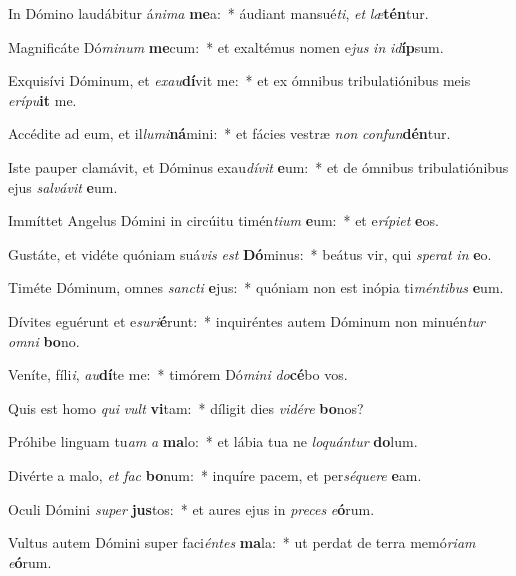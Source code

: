 \item In Dómino laudábitur á\textit{ni}\textit{ma} \textbf{me}a:~* áudiant mansué\textit{ti}, \textit{et} \textit{læ}\textbf{tén}tur.
\item Magnificáte Dó\textit{mi}\textit{num} \textbf{me}cum:~* et exaltémus nomen e\textit{jus} \textit{in} \textit{id}\textbf{íp}sum.
\item Exquisívi Dóminum, et \textit{ex}\textit{au}\textbf{dí}vit me:~* et ex ómnibus tribulatiónibus meis \textit{e}\textit{rí}\textit{pu}\textbf{it} me.
\item Accédite ad eum, et il\textit{lu}\textit{mi}\textbf{ná}mini:~* et fácies vestræ \textit{non} \textit{con}\textit{fun}\textbf{dén}tur.
\item Iste pauper clamávit, et Dóminus exau\textit{dí}\textit{vit} \textbf{e}um:~* et de ómnibus tribulatiónibus ejus \textit{sal}\textit{vá}\textit{vit} \textbf{e}um.
\item Immíttet Angelus Dómini in circúitu timén\textit{ti}\textit{um} \textbf{e}um:~* et e\textit{rí}\textit{pi}\textit{et} \textbf{e}os.
\item Gustáte, et vidéte quóniam suá\textit{vis} \textit{est} \textbf{Dó}minus:~* beátus vir, qui \textit{spe}\textit{rat} \textit{in} \textbf{e}o.
\item Timéte Dóminum, omnes \textit{sanc}\textit{ti} \textbf{e}jus:~* quóniam non est inópia ti\textit{mén}\textit{ti}\textit{bus} \textbf{e}um.
\item Dívites eguérunt et e\textit{su}\textit{ri}\textbf{é}runt:~* inquiréntes autem Dóminum non minuén\textit{tur} \textit{om}\textit{ni} \textbf{bo}no.
\item Veníte, fíli\textit{i}, \textit{au}\textbf{dí}te me:~* timórem Dó\textit{mi}\textit{ni} \textit{do}\textbf{cé}bo vos.
\item Quis est homo \textit{qui} \textit{vult} \textbf{vi}tam:~* díligit dies \textit{vi}\textit{dé}\textit{re} \textbf{bo}nos?
\item Próhibe linguam tu\textit{am} \textit{a} \textbf{ma}lo:~* et lábia tua ne \textit{lo}\textit{quán}\textit{tur} \textbf{do}lum.
\item Divérte a malo, \textit{et} \textit{fac} \textbf{bo}num:~* inquíre pacem, et per\textit{sé}\textit{que}\textit{re} \textbf{e}am.
\item Oculi Dómini \textit{su}\textit{per} \textbf{jus}tos:~* et aures ejus in \textit{pre}\textit{ces} \textit{e}\textbf{ó}rum.
\item Vultus autem Dómini super faci\textit{én}\textit{tes} \textbf{ma}la:~* ut perdat de terra memó\textit{ri}\textit{am} \textit{e}\textbf{ó}rum.

